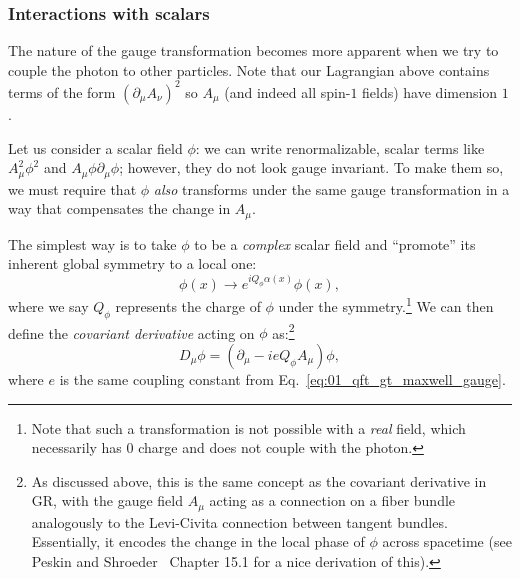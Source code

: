 
\subsubsection{Interactions with scalars}

The \UU[1] nature of the gauge transformation becomes more apparent when we try to couple the photon to other particles.
Note that our Lagrangian above contains terms of the form $(\partial_\mu A_\nu)^2$ so $A_\mu$ (and indeed all spin-$1$ fields) have dimension $1$.

Let us consider a scalar field $\phi$: we can write renormalizable, scalar terms like $A_\mu^2\phi^2$ and $A_\mu \phi\partial_\mu\phi$; however, they do not look gauge invariant.
To make them so, we must require that $\phi$ \textit{also} transforms under the same gauge transformation in a way that compensates the change in $A_\mu$.

The simplest way is to take $\phi$ to be a \textit{complex} scalar field and ``promote'' its inherent global \UU[1] symmetry to a local one:
\begin{equation}
	\label{eq:01_qft_gt_maxwell_scalar_gauge}
	\phi(x) \rightarrow e^{iQ_\phi\alpha(x)}\phi(x),
\end{equation}
where we say $Q_\phi$ represents the charge of $\phi$ under the \UU[1] symmetry.\footnote{Note that such a transformation is not possible with a \textit{real} field, which necessarily has $0$ charge and does not couple with the photon.}
We can then define the \textit{covariant derivative} acting on $\phi$ as:\footnote{As discussed above, this is the same concept as the covariant derivative in GR, with the gauge field $A_\mu$ acting as a connection on a \UU[1] fiber bundle analogously to the Levi-Civita connection between tangent bundles.
Essentially, it encodes the change in the local phase of $\phi$ across spacetime (see Peskin and Shroeder~\cite{Peskin:1995ev} Chapter 15.1 for a nice derivation of this).
}
\begin{equation}
	\label{eq:01_qft_gt_maxwell_covariant_derivative}
	D_\mu\phi = (\partial_\mu - ieQ_\phi A_\mu)\phi,
\end{equation}
where $e$ is the same coupling constant from Eq.~\ref{eq:01_qft_gt_maxwell_gauge}.

